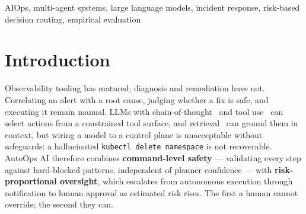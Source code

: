 \documentclass[conference]{IEEEtran}
\begin{document}
\begin{abstract}
Detecting infrastructure failures is mature; diagnosing, fixing and
safely executing a remediation remains manual. AutoOps AI is a
closed-loop multi-agent framework whose risk-scoring engine routes every
generated plan to autonomous execution, notification or a human approval
gate, behind an independent command-pattern check no approval can
override. We test whether it generalizes remediation \emph{planning} to
five incident classes held out from its remediation knowledge (though
detectable by predefined signatures), scoring plan \emph{content}
against a per-class rubric because a simulated executor's success flag
is independent of plan quality. Scoring \emph{containment} of a required
action rewards verbosity: a length-matched random planner scores 58.8\%.
Requiring a correct action \emph{and} no irrelevant one, the full system
reaches \textbf{47.0\%} intent-to-treat (95\% CI 37.5--56.7; 50.5\% over
the 93 incidents where the model produced a usable plan) against
\textbf{4.3\%} for that control (incident-level Monte Carlo null,
$p\approx5.0\times10^{-5}$), at $4.1\times$ the median latency; a
rule-based arm scores 0.0\% by construction. On covered classes the full
and rule-based arms score identically (66.7\%), concealing a regression
on one class, a matching gain on another, and a memory cache replicating
correct and incorrect fixes alike. Content-aware scoring also exposed
non-dispatchable template actions, a source-attribution bug, and a risk
score whose dominant inputs are self-reported by the planner and
saturate its range. Retrieval contributed nothing to the held-out
experiment and remains untested. All results use
\texttt{openai/gpt-oss-120b}.
\end{abstract}

\begin{IEEEkeywords}
AIOps, multi-agent systems, large language models, incident response,
risk-based decision routing, empirical evaluation
\end{IEEEkeywords}

\section{Introduction}

Observability tooling has matured; diagnosis and remediation have not.
Correlating an alert with a root cause, judging whether a fix is safe,
and executing it remain manual. LLMs with chain-of-thought~\cite{cot} and
tool use~\cite{react} can select actions from a constrained tool
surface, and retrieval~\cite{rag-lewis} can ground them in context, but
wiring a model to a control plane is unacceptable without safeguards: a
hallucinated \texttt{kubectl delete namespace} is not recoverable.
AutoOps AI therefore combines \textbf{command-level safety} ---
validating every step against hard-blocked patterns, independent of
planner confidence --- with \textbf{risk-proportional oversight}, which
escalates from autonomous execution through notification to human
approval as estimated risk rises. The first a human cannot override;
the second they can.
\end{document}
